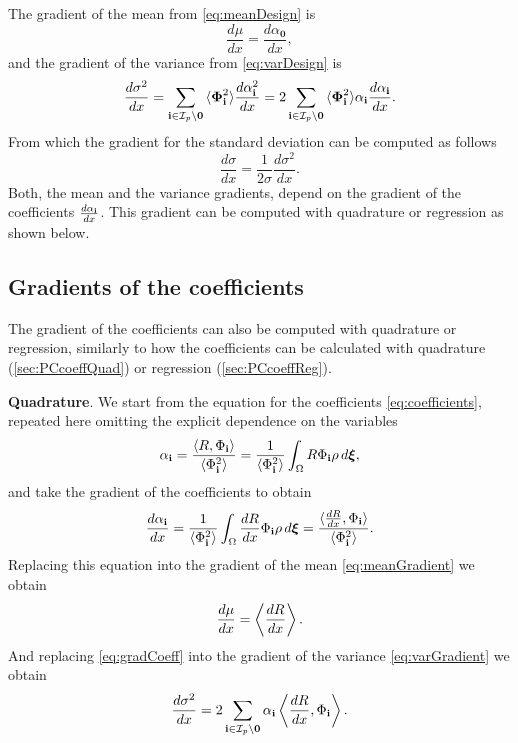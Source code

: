 The gradient of the mean from \cref{eq:meanDesign} is
\begin{equation}
  \frac{d\mu}{dx} = \frac{d\alpha_\mathbf{0}}{dx},
  \label{eq:meanGradient}
\end{equation}
and the gradient of the variance from \cref{eq:varDesign} is
\begin{equation}
  \frac{d\sigma^2}{dx} = \sum_{\mathbf{i}\in \mathcal{I}_p\setminus \mathbf{0}} {\braket{\boldsymbol{\Phi}_{\mathbf{i}}^2}} \frac{d\alpha_{\mathbf{i}}^2}{dx}
  = 2 \sum_{\mathbf{i}\in \mathcal{I}_p\setminus \mathbf{0}} {\braket{\boldsymbol{\Phi}_{\mathbf{i}}^2}} \alpha_{\mathbf{i}} \frac{d\alpha_{\mathbf{i}}}{dx}.
  \label{eq:varGradient}
\end{equation}
From which the gradient for the standard deviation can be computed as follows
\begin{equation}
  \frac{d\sigma}{dx} = \frac{1}{2\sigma}\frac{d\sigma^2}{dx}.
\end{equation}
Both, the mean and the variance gradients, depend on the gradient of the coefficients $\frac{d\alpha_{\mathbf{i}}}{dx}$. This gradient can be computed with quadrature or regression as shown below.

\subsection{Gradients of the coefficients}
\label{sec:GradientCoefficients}
The gradient of the coefficients can also be computed with quadrature or regression, similarly to how the coefficients can be calculated with quadrature (\cref{sec:PCcoeffQuad}) or regression (\cref{sec:PCcoeffReg}).

\textbf{Quadrature}.
We start from the equation for the coefficients \cref{eq:coefficients}, repeated here omitting the explicit dependence on the variables
\begin{equation}
  \alpha_{\mathbf{i}} = \frac{\braket{R,\Phi_{\mathbf{i}}}}{\braket{\Phi_{\mathbf{i}}^2}} =
  \frac{1}{{\braket{\Phi_{\mathbf{i}}^2}}}
  \int_\Omega R \Phi_{\mathbf{i}} \rho \, d\boldsymbol{\xi},
\end{equation}
and take the gradient of the coefficients to obtain
\begin{equation}
  \frac{d\alpha_{\mathbf{i}}}{dx} =
  \frac{1}{{\braket{\Phi_{\mathbf{i}}^2}}} \int_{\Omega}\frac{dR}{dx} \Phi_{\mathbf{i}} \rho \, d\boldsymbol{\xi}
  = \frac{\braket{\frac{dR}{dx},\Phi_{\mathbf{i}}}}{\braket{\Phi_{\mathbf{i}}^2}}.
  \label{eq:gradCoeff}
\end{equation}
Replacing this equation into the gradient of the mean \cref{eq:meanGradient} we obtain
\begin{equation}
  \frac{d\mu}{dx} = \Braket{\frac{dR}{dx}}.
  \label{eq:gradientMeanPCq}
\end{equation}
And replacing \cref{eq:gradCoeff} into the gradient of the variance \cref{eq:varGradient} we obtain
\begin{equation}
  \frac{d\sigma^2}{dx} = 2 \sum_{\mathbf{i}\in \mathcal{I}_p\setminus \mathbf{0}} \alpha_{\mathbf{i}}  \Braket{\frac{dR}{dx},\Phi_{\mathbf{i}}}.
\end{equation}

